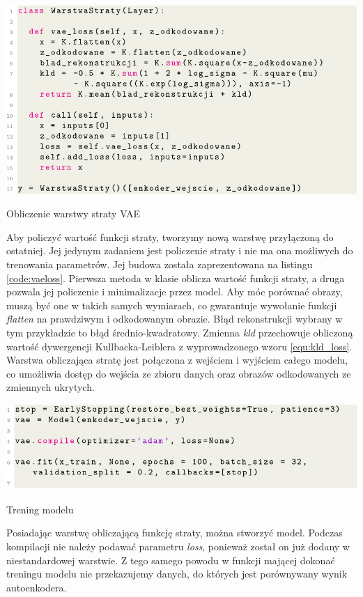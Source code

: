 \documentclass[a4paper,12pt,oneside]{book} %
\begin{document}
\begin{code}[h!]
	\centering
	\includegraphics[width=\linewidth]{vaeloss.pdf}
	\caption{Obliczenie warstwy straty VAE}
	\label{code:vaeloss}
\end{code}

\newpage
Aby policzyć wartość funkcji straty, tworzymy nową warstwę przyłączoną do ostatniej. Jej jedynym zadaniem jest policzenie straty i nie ma ona możliwych do trenowania parametrów. Jej budowa została zaprezentowana na listingu \ref{code:vaeloss}. Pierwsza metoda w klasie oblicza wartość funkcji straty, a druga pozwala jej policzenie i minimalizacje przez model. Aby móc porównać obrazy, muszą być one w takich samych wymiarach, co gwarantuje wywołanie funkcji \textit{flatten} na prawdziwym i odkodowanym obrazie. Błąd rekonstrukcji wybrany w tym przykładzie to błąd średnio-kwadratowy. Zmienna \textit{kld} przechowuje obliczoną wartość dywergencji Kullbacka-Leiblera z wyprowadzonego wzoru \ref{equ:kld_loss}. Warstwa obliczająca stratę jest połączona z wejściem i wyjściem całego modelu, co umożliwia dostęp do wejścia ze zbioru danych oraz obrazów odkodowanych ze zmiennych ukrytych. 

\begin{code}[h!]
	\centering
	\includegraphics[width=\linewidth]{vaetrain.pdf}
	\caption{Trening modelu}
\end{code}

Posiadając warstwę obliczającą funkcję straty, można stworzyć model. Podczas kompilacji nie należy podawać parametru \textit{loss}, ponieważ został on już dodany w niestandardowej warstwie. Z tego samego powodu w funkcji mającej dokonać treningu modelu nie przekazujemy danych, do których jest porównywany wynik autoenkodera.
\end{document}
